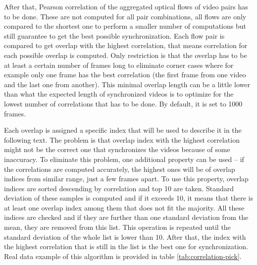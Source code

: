 After that, Pearson correlation of the aggregated optical flows of video pairs has to be done. These are not computed for all pair combinations, all flows are only compared to the shortest one to perform a smaller number of computations but still guarantee to get the best possible synchronization. Each flow pair is compared to get overlap with the highest correlation, that means correlation for each possible overlap is computed. Only restriction is that the overlap has to be at least a certain number of frames long to eliminate corner cases where for example only one frame has the best correlation (the first frame from one video and the last one from another). This minimal overlap length can be a little lower than what the expected length of synchronized videos is to optimize for the lowest number of correlations that has to be done. By default, it is set to 1000 frames.

Each overlap is assigned a specific index that will be used to describe it in the following text. The problem is that overlap index with the highest correlation might not be the correct one that synchronizes the videos because of some inaccuracy. To eliminate this problem, one additional property can be used -- if the correlations are computed accurately, the highest ones will be of overlap indices from similar range, just a few frames apart. To use this property, overlap indices are sorted descending by correlation and top 10 are taken. Standard deviation of these samples is computed and if it exceeds 10, it means that there is at least one overlap index among them that does not fit the majority. All these indices are checked and if they are further than one standard deviation from the mean, they are removed from this list. This operation is repeated until the standard deviation of the whole list is lower than 10. After that, the index with the highest correlation that is still in the list is the best one for synchronization. Real data example of this algorithm is provided in table \ref{tab:correlation-pick}.

